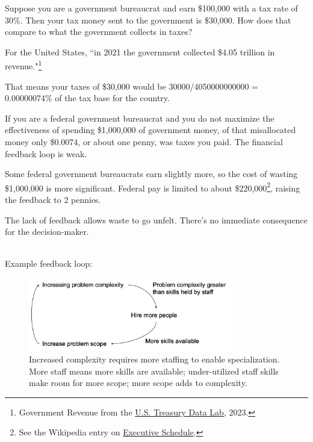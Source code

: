 \begin{mdframed}[frametitle={Taxes and Spending},frametitlerule=true,frametitlealignment=\centering]
Suppose you are a government bureaucrat and earn \$100,000 with a tax rate of 30\%. Then your tax money sent to the government is \$30,000.
How does that compare to what the government collects in taxes?

For the United States, ``in 2021 the government collected \$4.05 trillion in revenue."\footnote{Government Revenue from the \href{https://datalab.usaspending.gov/americas-finance-guide/revenue/}{U.S. Treasury Data Lab}, 2023.}

That means your taxes of \$30,000 would be
30000/4050000000000 = 0.00000074\% of the tax base for the country.

If you are a federal government bureaucrat and you do not maximize the effectiveness of spending \$1,000,000 of government money, of that misallocated money only \$0.0074, or about one penny, was taxes you paid. The financial feedback loop is weak.

Some federal government bureaucrats earn slightly more, so the cost of wasting \$1,000,000 is more significant.
Federal pay is limited to about \$220,000\footnote{See the Wikipedia entry on \href{https://en.wikipedia.org/wiki/Executive\_Schedule}{Executive Schedule}.
}, raising the feedback to 2 pennies.
\end{mdframed}

The lack of feedback allows waste to go unfelt. There's no immediate consequence for the decision-maker.

\ \\

Example feedback loop:
\begin{center}
\begin{figure}[ht]
    \centering
    \includegraphics[width=0.8\textwidth]{images/feedback_loop_complexity_and_staffing}
    \caption{Increased complexity requires more staffing to enable specialization. More staff means more skills are available; under-utilized staff skills make room for more scope; more scope adds to complexity.}
    \label{fig:complexity_and_staff_growth}
\end{figure}
\end{center}

